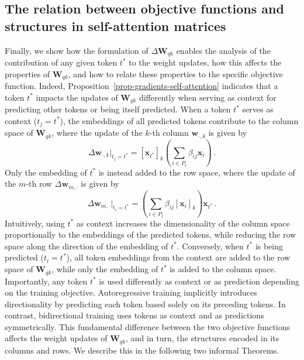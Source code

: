 \subsection{The relation between objective functions and structures in self-attention matrices}
%
Finally, we show how the formulation of $\Delta \bm{W}_{qk}$ enables the analysis of the contribution of any given token $t^*$ to the weight updates, how this affects the properties of $\bm{W}_{qk}$, and how to relate these properties to the specific objective function.
%
Indeed, Proposition~\ref{prop-gradients-self-attention} indicates that a token $t^*$ impacts the updates of $\bm{W}_{qk}$ differently when serving as context for predicting other tokens or being itself predicted.
%
When a token $t^*$ serves as context ($t_j = t^*$), the embeddings of all predicted tokens contribute to the column space of $\bm{W}_{qk}$, where the update of the $k$-th column $\bm{w}_{\cdot, k}$ is given by
%
\begin{equation}
    \Delta \bm{w}_{\cdot, k} \bigg|_{t_j = t^*}= [\bm{x}_{t^*}]_k \left(\sum_{i \in P_{t}}\beta_{ij}\bm{x}_i\right)\,.
\end{equation}
%
Only the embedding of $t^*$ is instead added to the row space, where the update of the $m$-th row $\Delta \bm{w}_{m, \cdot}$ is given by
%
\begin{equation}
    \Delta \bm{w}_{m, \cdot} \bigg|_{t_i = t^*} = \left(\sum_{i \in P_{t}}\beta_{ij}[\bm{x}_{i}]_k\right)\bm{x}_{t^*}\,.
\end{equation}
%
Intuitively, using $t^*$ as context increases the dimensionality of the column space proportionally to the embeddings of the predicted tokens, while reducing the row space along the direction of the embedding of $t^*$.
%
Conversely, when $t^*$ is being predicted ($t_i = t^*$), all token embeddings from the context are added to the row space of $\bm{W}_{qk}$, while only the embedding of $t^*$ is added to the column space.
%
Importantly, any token $t^*$ is used differently as context or as prediction depending on the training objective. 
%
Autoregressive training implicitly introduces directionality by predicting each token based solely on its preceding tokens. 
%
In contrast, bidirectional training uses tokens as context and as predictions symmetrically.
%
This fundamental difference between the two objective functions affects the weight updates of $\bm{W}_{qk}$, and in turn, the structures encoded in its columns and rows.
%
We describe this in the following two informal Theorems.
%

